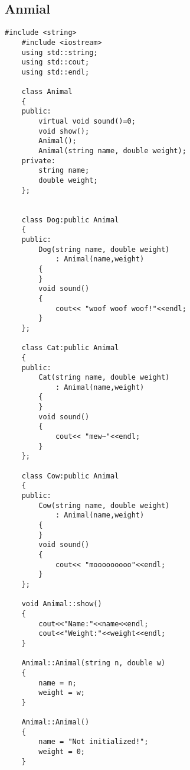 \documentclass[UTF8]{ctexart}
\begin{document}
\subsection{Anmial}
\begin{lstlisting}[language={[ANSI]C++}]
    #include <string>
    #include <iostream>
    using std::string;
    using std::cout;
    using std::endl;
    
    class Animal
    {
    public:
        virtual void sound()=0;
        void show();
        Animal();
        Animal(string name, double weight);
    private:
        string name;
        double weight;
    };
    
    
    class Dog:public Animal
    {
    public:
        Dog(string name, double weight)
            : Animal(name,weight)
        {        
        }
        void sound()
        {
            cout<< "woof woof woof!"<<endl;
        }
    };
    
    class Cat:public Animal
    {
    public:
        Cat(string name, double weight)
            : Animal(name,weight)
        {        
        }
        void sound()
        {
            cout<< "mew~"<<endl;
        }    
    };
    
    class Cow:public Animal
    {
    public:
        Cow(string name, double weight)
            : Animal(name,weight)
        {        
        }
        void sound()
        {
            cout<< "mooooooooo"<<endl;
        }    
    };
    
    void Animal::show()
    {
        cout<<"Name:"<<name<<endl;
        cout<<"Weight:"<<weight<<endl;
    }
    
    Animal::Animal(string n, double w)
    {
        name = n;
        weight = w;
    }
    
    Animal::Animal()
    {
        name = "Not initialized!";
        weight = 0;    
    }
\end{lstlisting}
\end{document}
